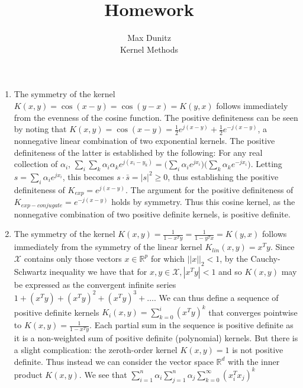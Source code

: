 \documentclass[12pt]{article}
\newenvironment{exercise}[2][Exercise]{\begin{trivlist}
\item[\hskip \labelsep {\bfseries #1}\hskip \labelsep {\bfseries #2.}]}{\end{trivlist}}
\begin{document}
 
 
\title{Homework}%
\author{Max Dunitz\\ %
Kernel Methods} %
 
\maketitle


\begin{exercise}{1} 
	\begin{enumerate}
		\item The symmetry of the kernel $K(x,y) = \cos (x-y) = \cos (y-x) = K(y,x)$ follows immediately from the evenness of the cosine function. The positive definiteness can be seen by noting that $K(x,y) = \cos(x-y) = \frac{1}{2} e^{j(x-y)} + \frac{1}{2} e^{-j(x-y)}$, a nonnegative linear combination of two exponential kernels. The positive definiteness of the latter is established by the following: For any real collection of $\alpha_i$, $\sum_i \sum_k \alpha_i \alpha_k e^{j(x_i - y_k)} = \big(\sum_i \alpha_i e^{jx_i}\big)\big(\sum_k \alpha_k e^{-j x_i} \big).$ Letting $s=\sum_i \alpha_i e^{jx_i}$, this becomes $s \cdot \bar{s} = |s|^2 \geq 0$, thus establishing the positive definiteness of $K_{exp} = e^{j(x-y)}$. The argument for the positive definiteness of $K_{exp-conjugate} = e^{-j(x-y)}$ holds by symmetry. Thus this cosine kernel, as the nonnegative combination of two positive definite kernels, is positive definite.
		\item The symmetry of the kernel $K(x,y) = \frac{1}{1-x^Ty} = \frac{1}{1-y^Tx} = K(y,x)$ follows immediately from the symmetry of the linear kernel $K_{lin}(x,y) = x^Ty$. Since $\mathcal{X}$ contains only those vectors $x \in \mathbb{R}^p$ for which $||x||_2 < 1$, by the Cauchy-Schwartz inequality we have that for $x,y \in \mathcal{X}, |x^T y| < 1$ and so $K(x,y)$ may be expressed as the convergent infinite series $1 + (x^T y) + (x^T y)^2 + (x^T y)^3 + \ldots.$ We can thus define a sequence of positive definite kernels $K_i(x,y) = \sum_{k=0}^i (x^Ty)^k$ that converges pointwise to $K(x,y) = \frac{1}{1-x^Ty}$. Each partial sum in the sequence is positive definite as it is a non-weighted sum of positive definite (polynomial) kernels. But there is a slight complication: the zeroth-order kernel $K(x,y) = 1$ is not positive definite. Thus instead we can consider the vector space $\mathbb{R}^d$ with the inner product $K(x,y)$. We see that $\sum_{i=1}^n \alpha_i \sum_{j=1}^n \alpha_j \sum_{k=0}^\infty (x_i^T x_j)^k$

\end{enumerate}
\end{exercise}
\end{document}
